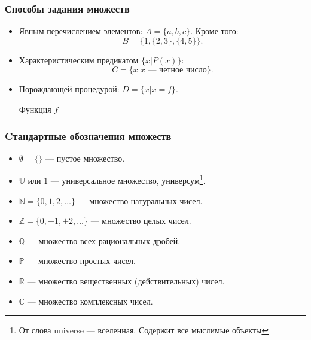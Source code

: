 \begin{frame}
    \frametitle{Способы задания множеств}
    
    \begin{itemize}
        \item Явным перечислением элементов: $A=\{a,b,c\}$. Кроме того:
            \[
                B=\{1,\{2,3\},\{4,5\}\}.
            \]
        \item Характеристическим предикатом $\{x|P(x)\}$:
            \[
                C=\{x|x\text{ --- четное число}\}.
            \]
        \item Порождающей процедурой: $D=\{x|x=f\}$.
            \begin{algorithm}[H]
                \caption{Функция $f$}
                \begin{algorithmic}[1]
                         
                    \ENDFOR
                \end{algorithmic}
            \end{algorithm}
        
    \end{itemize}
\end{frame}

\begin{frame}
    \frametitle{Cтандартные обозначения множеств}
    
    \begin{itemize}
        \item $\emptyset=\{\}$ --- \alert{пустое} множество.
        \item $\mathbb{U}$ или $1$ --- \alert{универсальное} множество, \alert{универсум}\footnote{От слова universe --- вселенная. Содержит \alert{все} мыслимые объекты}.
        \item $\mathbb{N}=\{0,1,2,\ldots\}$ --- множество натуральных чисел.
        \item $\mathbb{Z}=\{0,\pm 1,\pm 2,\ldots\}$ --- множество целых чисел.
        \item $\mathbb{Q}$ --- множество всех рациональных дробей.
        \item $\mathbb{P}$ --- множество простых чисел.
        \item $\mathbb{R}$ --- множество вещественных (действительных) чисел.
        \item $\mathbb{C}$ --- множество комплексных чисел.
    \end{itemize}
\end{frame}


